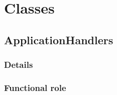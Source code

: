 \section{Classes}
\subsection{ApplicationHandlers}
\subsubsection{Details}
\subsubsection{Functional role}